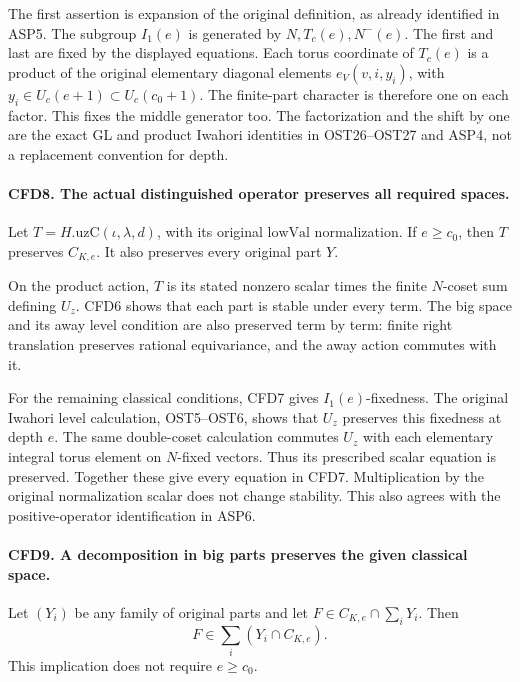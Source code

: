 \documentclass[11pt,a4paper]{article}
\numberwithin{equation}{section}
\theoremstyle{remark}\newtheorem{remark}[theorem]{Remark}
\begin{document}
The first assertion is expansion of the original definition, as already
identified in ASP5.  The subgroup \(I_1(e)\) is generated by
\(N,T_c(e),N^-(e)\).  The first and last are fixed by the displayed
equations.  Each torus coordinate of \(T_c(e)\) is a product of the
original elementary diagonal elements \(e_V(v,i,y_i)\), with
\(y_i\in U_c(e+1)\subset U_c(c_0+1)\).  The finite-part character
is therefore one on each factor.  This fixes the middle generator too.
The factorization and the shift by one are the exact GL and product
Iwahori identities in OST26--OST27 and ASP4, not a replacement convention
for depth.

\paragraph{CFD8. The actual distinguished operator preserves all required spaces.}
\label{claim:CFD8}
Let \(T=H.\mathrm{uzC}(\iota,\lambda,d)\), with its original
\(\mathrm{lowVal}\) normalization.  If \(e\ge c_0\), then \(T\)
preserves \(C_{K,e}\).  It also preserves every original part \(Y\).

On the product action, \(T\) is its stated nonzero scalar times the
finite \(N\)-coset sum defining \(U_z\).  CFD6 shows that each part is
stable under every term.  The big space and its away level condition are
also preserved term by term: finite right translation preserves rational
equivariance, and the away action commutes with it.

For the remaining classical conditions, CFD7 gives \(I_1(e)\)-fixedness.
The original Iwahori level calculation, OST5--OST6, shows that \(U_z\)
preserves this fixedness at depth \(e\).  The same double-coset calculation
commutes \(U_z\) with each elementary integral torus element on
\(N\)-fixed vectors.  Thus its prescribed scalar equation is preserved.
Together these give every equation in CFD7.  Multiplication by the
original normalization scalar does not change stability.  This also
agrees with the positive-operator identification in ASP6.

\paragraph{CFD9. A decomposition in big parts preserves the given classical space.}
\label{claim:CFD9}
Let \((Y_i)\) be any family of original parts and let
\(F\in C_{K,e}\cap\sum_iY_i\).  Then
\[
                         F\in\sum_i(Y_i\cap C_{K,e}).
\]
This implication does not require \(e\ge c_0\).
\end{document}
